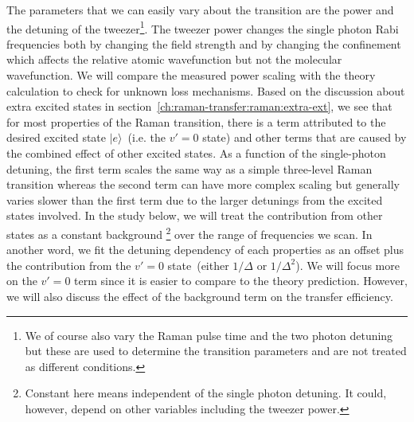 The parameters that we can easily vary about the transition
are the power and the detuning of the tweezer\footnote{
  We of course also vary the Raman pulse time and the two photon detuning
  but these are used to determine the transition parameters
  and are not treated as different conditions.}.
The tweezer power changes the single photon Rabi frequencies
both by changing the field strength and by changing the confinement
which affects the relative atomic wavefunction but not the molecular wavefunction.
We will compare the measured power scaling with the theory calculation
to check for unknown loss mechanisms.
Based on the discussion about extra excited states
in section~\ref{ch:raman-transfer:raman:extra-ext},
we see that for most properties of the Raman transition,
there is a term attributed to
the desired excited state $|e\rangle$~(i.e. the $v'=0$ state)
and other terms that are caused by the combined effect of other excited states.
As a function of the single-photon detuning,
the first term scales the same way as a simple three-level Raman transition
whereas the second term can have more complex scaling but generally varies slower
than the first term due to the larger detunings from the excited states involved.
In the study below, we will treat the contribution from other states as a constant background
\footnote{Constant here means independent of the single photon detuning.
  It could, however, depend on other variables including the tweezer power.}
over the range of frequencies we scan.
In another word, we fit the detuning dependency of each properties
as an offset plus the contribution from the $v'=0$ state~(either $1/\Delta$ or $1/\Delta^2$).
We will focus more on the $v'=0$ term since it is easier to compare to the theory prediction.
However, we will also discuss the effect of the background term on the transfer efficiency.

